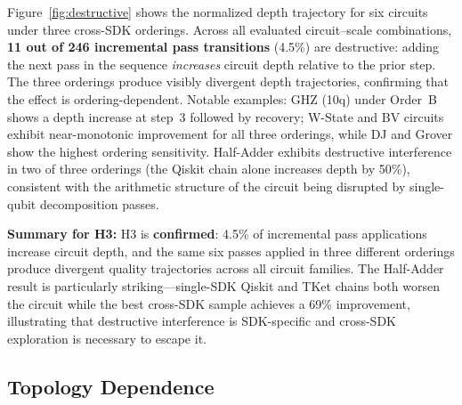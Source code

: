 \documentclass[conference]{IEEEtran}
\begin{document}
Figure~\ref{fig:destructive} shows the normalized depth trajectory for six circuits under three cross-SDK orderings.
Across all evaluated circuit--scale combinations, \textbf{11 out of 246 incremental pass transitions} (4.5\%) are destructive: adding the next pass in the sequence \textit{increases} circuit depth relative to the prior step.
The three orderings produce visibly divergent depth trajectories, confirming that the effect is ordering-dependent.
Notable examples: GHZ (10q) under Order~B shows a depth increase at step~3 followed by recovery; W-State and BV circuits exhibit near-monotonic improvement for all three orderings, while DJ and Grover show the highest ordering sensitivity.
Half-Adder exhibits destructive interference in two of three orderings (the Qiskit chain alone increases depth by 50\%), consistent with the arithmetic structure of the circuit being disrupted by single-qubit decomposition passes.

\textbf{Summary for H3:}
H3 is \textbf{confirmed}: 4.5\% of incremental pass applications increase circuit depth, and the same six passes applied in three different orderings produce divergent quality trajectories across all circuit families.
The Half-Adder result is particularly striking---single-SDK Qiskit and TKet chains both worsen the circuit while the best cross-SDK sample achieves a 69\% improvement, illustrating that destructive interference is SDK-specific and cross-SDK exploration is necessary to escape it.

\subsection{Topology Dependence}
\label{sec:topology}
\end{document}
